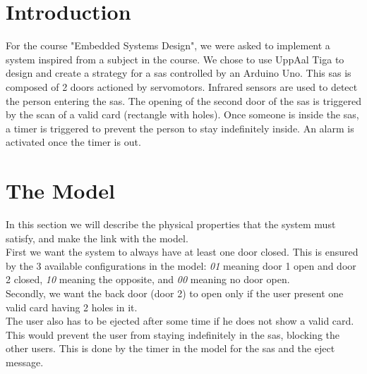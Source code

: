 

 

\thispagestyle{empty}

\titleTH %

\newpage

\tableofcontents
\newpage
\section{Introduction}
For the course "Embedded Systems Design", we were asked to implement a system inspired from a subject in the course. We chose to use UppAal Tiga to design and create a strategy for a sas controlled by an Arduino Uno. This sas is composed of 2 doors actioned by servomotors. Infrared sensors are used to detect the person entering the sas. The opening of the second door of the sas is triggered by the scan of a valid card (rectangle with holes). Once someone is inside the sas, a timer is triggered to prevent the person to stay indefinitely inside. An alarm is activated once the timer is out.

\section{The Model}

In this section we will describe the physical properties that the system must satisfy, and make the link with the model.\\

First we want the system to always have at least one door closed. This is ensured by the 3 available configurations in the model: \emph{01} meaning door 1 open and door 2 closed, \emph{10} meaning the opposite, and \emph{00} meaning no door open.\\

Secondly, we want the back door (door 2) to open only if the user present one valid card having 2 holes in it.\\

The user also has to be ejected after some time if he does not show a valid card. This would prevent the user from staying indefinitely in the sas, blocking the other users. This is done by the timer in the model for the sas and the eject message. \\

